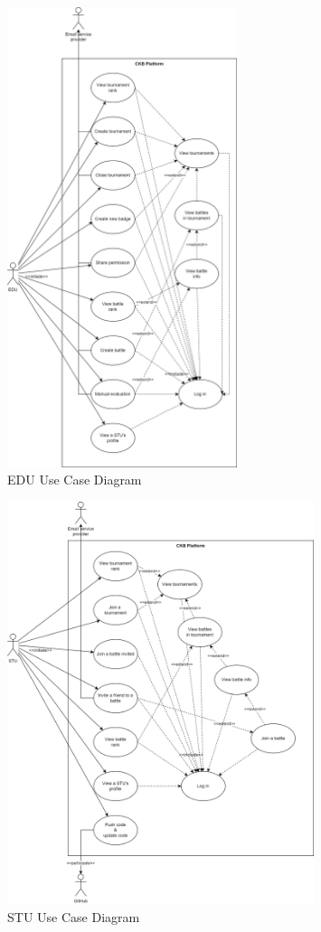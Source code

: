 \begin{figure}[H]
    \centering
    \includegraphics[width=0.6\textwidth]{images/sequence_diagrams/use_case_diagrams_EDU.png}
    \caption{EDU Use Case Diagram}
\end{figure}

\begin{figure}[H]
    \centering
    \includegraphics[width=0.8\textwidth]{images/sequence_diagrams/use_case_diagrams_STU.png}
    \caption{STU Use Case Diagram}
\end{figure}

